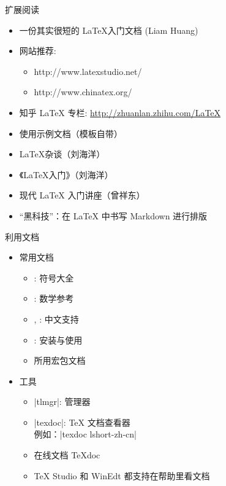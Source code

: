 \begin{frame}{扩展阅读}
  \begin{itemize}
    \item 一份其实很短的 \LaTeX 入门文档 (Liam Huang) 
    \item 网站推荐:
      \begin{itemize}
        \item http://www.latexstudio.net/
        \item http://www.chinatex.org/
      \end{itemize}
    \item 知乎 LaTeX 专栏: \url{http://zhuanlan.zhihu.com/LaTeX}
    \item \ThuThesis{}使用示例文档（模板自带）
    \item \LaTeX{}杂谈（刘海洋）
    \item 《\LaTeX{}入门》（刘海洋）
    \item 现代 LaTeX 入门讲座（曾祥东）
    \item “黑科技”：在 \LaTeX{} 中书写 Markdown 进行排版 
  \end{itemize}
\end{frame}


\begin{frame}[fragile]{利用文档}
  \begin{itemize}
    \item 常用文档
      \begin{itemize}
        \item {}: 符号大全
        \item {}: 数学参考
        \item {}, : 中文支持
        \item {}: \TL 安装与使用
        \item 所用宏包文档
      \end{itemize}
    \item 工具
      \begin{itemize}
        \item |tlmgr|: \TL 管理器
        \item |texdoc|: \TeX{} 文档查看器\\
          例如：|texdoc lshort-zh-cn|
        \item 在线文档 \TeX{}doc 
        \item TeX Studio 和 WinEdt 都支持在帮助里看文档
      \end{itemize}
  \end{itemize}
\end{frame}

